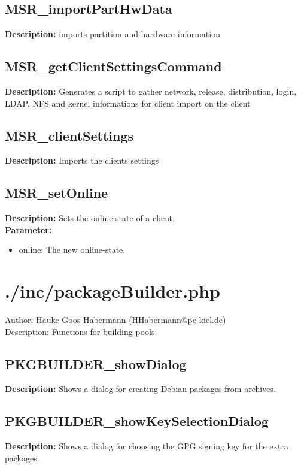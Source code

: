 \subsection{MSR\_importPartHwData}
\textbf{Description:} imports partition and hardware information\\

\subsection{MSR\_getClientSettingsCommand}
\textbf{Description:} Generates a script to gather network, release, distribution, login, LDAP, NFS and kernel informations for client import on the client\\

\subsection{MSR\_clientSettings}
\textbf{Description:} Imports the clients settings\\

\subsection{MSR\_setOnline}
\textbf{Description:} Sets the online-state of a client.\\
\textbf{Parameter:}
\begin{itemize}
\item online: The new online-state.
\end{itemize}

\newpage\section{./inc/packageBuilder.php}
 Author: Hauke Goos-Habermann (HHabermann@pc-kiel.de)\\
 Description: Functions for building pools.\\

\subsection{PKGBUILDER\_showDialog}
\textbf{Description:} Shows a dialog for creating Debian packages from archives.\\

\subsection{PKGBUILDER\_showKeySelectionDialog}
\textbf{Description:} Shows a dialog for choosing the GPG signing key for the extra packages.\\

